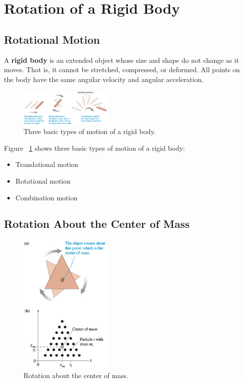 \section{Rotation of a Rigid Body}

\subsection{Rotational Motion}

A \textbf{rigid body} is an extended object whose size and shape do not
change as it moves.  That is, it cannot be stretched, compressed, or
deformed.  All points on the body have the same angular velocity and
angular acceleration.

\begin{figure}
    \centering
    \includegraphics[width=0.4\textwidth]{../figures/basic-types-of-motion.png}
    \caption{Three basic types of motion of a rigid body.}%
    \label{fig:basic-types-of-motion}
\end{figure}

Figure~%
\ref{fig:basic-types-of-motion} shows three basic types of motion of a
rigid body:
\begin{itemize}
    \item
        Translational motion
    \item
        Rotational motion
    \item
        Combination motion
\end{itemize}

\subsection{Rotation About the Center of Mass}

\begin{figure}
    \centering
    \includegraphics[width=0.4\textwidth]{../figures/rotation-center-of-mass.png}
    \caption{Rotation about the center of mass.}%
    \label{fig:rotation-center-of-mass}
\end{figure}

